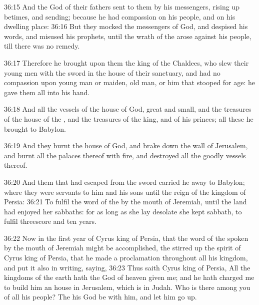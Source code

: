 36:15 And the \LORD God of their fathers sent to them by his
messengers, rising up betimes, and sending; because he had compassion
on his people, and on his dwelling place: 36:16 But they mocked the
messengers of God, and despised his words, and misused his prophets,
until the wrath of the \LORD arose against his people, till there was
no remedy.

36:17 Therefore he brought upon them the king of the Chaldees, who
slew their young men with the sword in the house of their sanctuary,
and had no compassion upon young man or maiden, old man, or him that
stooped for age: he gave them all into his hand.

36:18 And all the vessels of the house of God, great and small, and
the treasures of the house of the \LORD, and the treasures of the king,
and of his princes; all these he brought to Babylon.

36:19 And they burnt the house of God, and brake down the wall of
Jerusalem, and burnt all the palaces thereof with fire, and destroyed
all the goodly vessels thereof.

36:20 And them that had escaped from the sword carried he away to
Babylon; where they were servants to him and his sons until the reign
of the kingdom of Persia: 36:21 To fulfil the word of the \LORD by the
mouth of Jeremiah, until the land had enjoyed her sabbaths: for as
long as she lay desolate she kept sabbath, to fulfil threescore and
ten years.

36:22 Now in the first year of Cyrus king of Persia, that the word of
the \LORD spoken by the mouth of Jeremiah might be accomplished, the
\LORD stirred up the spirit of Cyrus king of Persia, that he made a
proclamation throughout all his kingdom, and put it also in writing,
saying, 36:23 Thus saith Cyrus king of Persia, All the kingdoms of the
earth hath the \LORD God of heaven given me; and he hath charged me to
build him an house in Jerusalem, which is in Judah. Who is there among
you of all his people?  The \LORD his God be with him, and let him go up.

